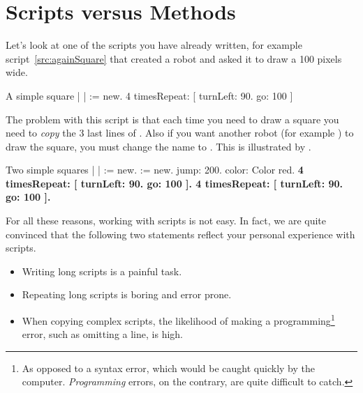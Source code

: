 \section{Scripts versus Methods}
\newcommand{\replace}[2]{Let us}{Let's} look at one of the scripts you have \newcommand{\replace}[2]{been}{already} written\newcommand{\remove}[1]{ so far}, for
example\newcommand{\remove}[1]{, the} script~\ref{src:againSquare} that created a
robot and asked it to draw a \newcommand{\add}[1]{square} 100 pixels \newcommand{\replace}[2]{width square}{wide}. 
\begin{scriptwithtitle}{A simple square}\label{src:againSquare}
| \caro |
\caro := \Turtle new.
4 timesRepeat: 
   [ \caro turnLeft: 90.
   \caro go: 100 ]
\end{scriptwithtitle}
The problem with \newcommand{\replace}[2]{a}{this} script is that each time you need to draw a square
you need to \emph{copy} the 3 last lines of .  \newcommand{\replace}[2]{In addition,}{Also} if you want \newcommand{\replace}[2]{that}{another robot (for example \daly) to draw} the square\newcommand{\remove}[1]{ be drawn by another robot, \daly for example}, you must change \newcommand{\remove}[1]{everywhere} the name \caro to \daly\newcommand{\add}[1]{ everywhere}. This is illustrated by .
\begin{scriptwithtitle}{Two simple squares}\label{src:againSquare2}
| \caro \daly |
\caro := \Turtle new.
\daly := \Turtle new.
\daly jump: 200.
\daly color: Color red.
\textbf{
4 timesRepeat: 
         [ \caro turnLeft: 90.
         \caro go: 100 ].
4 timesRepeat: 
         [ \daly turnLeft: 90.
         \daly go: 100 ].}
\end{scriptwithtitle}
\newcommand{\replace}[2]{Because of all this}{For all these reasons}, working with scripts is not easy. In
fact, we are quite convinced that the \newcommand{\replace}[2]{two following}{following two} statements
reflect \newcommand{\replace}[2]{you}{your} personal experience with scripts.
\begin{itemize}
\item Writing long scripts is a painful task.
\item Repeating long scripts is boring and error prone. 
\item When copying complex scripts, the likelihood of making a
programming\footnote{As opposed to a syntax error, which would be
caught quickly by the computer. \emph{Programming} errors, on the
contrary, are quite difficult to catch.}  error, such as omitting a
line, is high.
\end{itemize}

